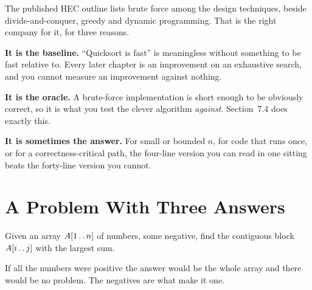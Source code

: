 \begin{conceptbox}
The published HEC outline lists brute force among the design techniques, beside
divide-and-conquer, greedy and dynamic programming. That is the right company
for it, for three reasons.

\begin{tightnum}
  \item \textbf{It is the baseline.} ``Quicksort is fast'' is meaningless
        without something to be fast relative to. Every later chapter is an
        improvement on an exhaustive search, and you cannot measure an
        improvement against nothing.
  \item \textbf{It is the oracle.} A brute-force implementation is short enough
        to be obviously correct, so it is what you test the clever algorithm
        \emph{against}. Section~7.4 does exactly this.
  \item \textbf{It is sometimes the answer.} For small or bounded $n$, for code
        that runs once, or for a correctness-critical path, the four-line
        version you can read in one sitting beats the forty-line version you
        cannot.
\end{tightnum}
\end{conceptbox}

\section{A Problem With Three Answers}

\begin{definitionbox}
Given an array $A[1 \mathinner{\ldotp\ldotp} n]$ of numbers, some negative,
find the contiguous block $A[i \mathinner{\ldotp\ldotp} j]$ with the largest
sum.

\smallskip
If all the numbers were positive the answer would be the whole array and there
would be no problem. The negatives are what make it one.
\end{definitionbox}


